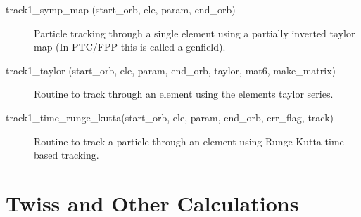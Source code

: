 \begin{description}
\label{r:track1.symp.map}
\item[track1_symp_map (start_orb, ele, param, end_orb)] \Newline
Particle tracking through a single element using a partially inverted 
taylor map (In PTC/FPP this is called a genfield). 

\label{r:track1.taylor}
\item[track1_taylor (start_orb, ele, param, end_orb, taylor, mat6, make_matrix)] \Newline
Routine to track through an element using the elements taylor series. 

\label{r:track1.time.runge.kutta}
\item[track1_time_runge_kutta(start_orb, ele, param, end_orb, err_flag, track)] \Newline 
Routine to track a particle through an element using 
Runge-Kutta time-based tracking.

\end{description}

\section{Twiss and Other Calculations}
\label{r:twiss}

